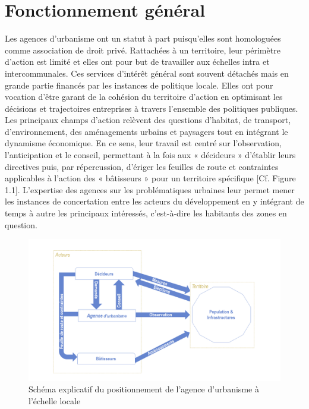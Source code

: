 \documentclass{bredele}
\begin{document}
\section{Fonctionnement général}
Les agences d’urbanisme ont un statut à part puisqu’elles sont homologuées comme association de droit privé. Rattachées à un territoire, leur périmètre d’action est limité et elles ont pour but de travailler aux échelles intra et intercommunales. Ces services d’intérêt général sont souvent détachés mais en grande partie financés par les instances de politique locale. Elles ont pour vocation d’être garant de la cohésion du territoire d’action en optimisant les décisions et trajectoires entreprises à travers l’ensemble des politiques publiques. Les principaux champs d’action relèvent des questions d’habitat, de transport, d’environnement, des aménagements urbains et paysagers tout en intégrant le dynamisme économique. En ce sens, leur travail est centré sur l’observation, l’anticipation et le conseil, permettant à la fois aux « décideurs » d’établir leurs directives puis, par répercussion, d’ériger les feuilles de route et contraintes applicables à l’action des « bâtisseurs » pour un territoire spécifique [Cf. Figure 1.1]. L’expertise des agences sur les problématiques urbaines leur permet mener les instances de concertation entre les acteurs du développement en y intégrant de temps à autre les principaux intéressés, c'est-à-dire les habitants des zones en question.
\begin{figure}
\begin{center}
\includegraphics[width=\textwidth]{schema_AGURBA.png}
\end{center}
\caption{Schéma explicatif du positionnement de l'agence d'urbanisme à l'échelle locale}
\end{figure}
\newpage
\end{document}
